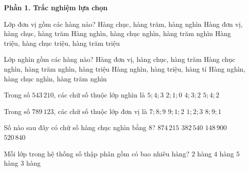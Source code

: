 \textbf{Phần 1. Trắc nghiệm lựa chọn}

\begin{ex} %
Lớp đơn vị gồm các hàng nào?
\choice
{Hàng chục, hàng trăm, hàng nghìn}
{\True Hàng đơn vị, hàng chục, hàng trăm}
{Hàng nghìn, hàng chục nghìn, hàng trăm nghìn}
{Hàng triệu, hàng chục triệu, hàng trăm triệu}
\end{ex}

\begin{ex} %
Lớp nghìn gồm các hàng nào?
\choice
{Hàng đơn vị, hàng chục, hàng trăm}
{Hàng chục nghìn, hàng trăm nghìn, hàng triệu}
{Hàng nghìn, hàng triệu, hàng tỉ}
{\True Hàng nghìn, hàng chục nghìn, hàng trăm nghìn}
\end{ex}

\begin{ex} %
Trong số $543\,210$, các chữ số thuộc lớp nghìn là
\choice
{\True $5; 4; 3$}
{$2; 1; 0$}
{$4; 3; 2$}
{$5; 4; 2$}
\end{ex}

\begin{ex} %
Trong số $789\,123$, các chữ số thuộc lớp đơn vị là
\choice
{$7; 8; 9$}
{$9; 1; 2$}
{\True $1; 2; 3$}
{$8; 9; 1$}
\end{ex}

\begin{ex} %
Số nào sau đây có chữ số hàng chục nghìn bằng 8?
\choice
{$874\,215$}
{\True $382\,540$}
{$148\,900$}
{$520\,840$}
\end{ex}

\begin{ex} %
Mỗi lớp trong hệ thống số thập phân gồm có bao nhiêu hàng?
\choice
{$2$ hàng}
{$4$ hàng}
{$5$ hàng}
{\True $3$ hàng}
\end{ex}

